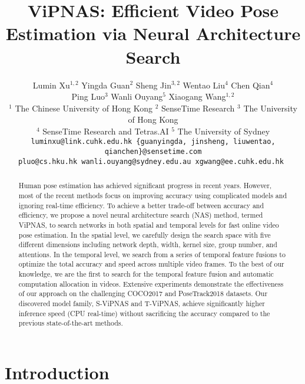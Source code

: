 \documentclass[final]{cvpr}
\begin{document}
\title{ViPNAS: Efficient Video Pose Estimation via Neural Architecture Search}

\author{Lumin Xu$^{1,2}$ \quad Yingda Guan$^{2}$ \quad Sheng Jin$^{3,2}$ \quad Wentao Liu$^{4}$ \quad Chen Qian$^{4}$ \\ Ping Luo$^{3}$ \quad Wanli Ouyang$^{5}$ \quad Xiaogang Wang$^{1,2}$ \\
$^{1}$ The Chinese University of Hong Kong \quad
$^{2}$ SenseTime Research \quad $^{3}$ The University of Hong Kong \\
$^{4}$ SenseTime Research and Tetras.AI \quad
$^{5}$ The University of Sydney \\
\tt\small luminxu@link.cuhk.edu.hk  \quad \{guanyingda, jinsheng, liuwentao, qianchen\}@sensetime.com \\
\tt\small pluo@cs.hku.hk    \quad wanli.ouyang@sydney.edu.au  \quad xgwang@ee.cuhk.edu.hk
}

\maketitle

\thispagestyle{empty}
\pagestyle{empty}

\begin{abstract}
   Human pose estimation has achieved significant progress in recent years. However, most of the recent methods focus on improving accuracy using complicated models and ignoring real-time efficiency. To achieve a better trade-off between accuracy and efficiency, we propose a novel neural architecture search (NAS) method, termed ViPNAS, to search networks in both spatial and temporal levels for fast online video pose estimation. In the spatial level, we carefully design the search space with five different dimensions including network depth, width, kernel size, group number, and attentions. In the temporal level, we search from a series of temporal feature fusions to optimize the total accuracy and speed across multiple video frames. To the best of our knowledge, we are the first to search for the temporal feature fusion and automatic computation allocation in videos. Extensive experiments demonstrate the effectiveness of our approach on the challenging COCO2017 and PoseTrack2018 datasets. Our discovered model family, S-ViPNAS and T-ViPNAS, achieve significantly higher inference speed (CPU real-time) without sacrificing the accuracy compared to the previous state-of-the-art methods.
\end{abstract}

\section{Introduction}
\end{document}
